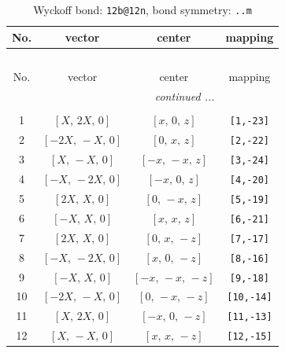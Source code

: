 \documentclass[fleqn,8pt]{jsarticle}
\begin{document}
\begin{longtable}{cccc}
\caption{Wyckoff bond: {\tt 12b@12n}, bond symmetry: {\tt ..m}}
 \\
 \hline \hline
No. & vector & center & mapping \\ \hline \endfirsthead

\multicolumn{3}{l}{\tablename\ \thetable{}} \\
 \hline \hline
No. & vector & center & mapping \\ \hline \endhead

 \hline \hline
\multicolumn{3}{r}{\footnotesize\it continued ...} \\ \endfoot

 \hline \hline
\multicolumn{3}{r}{} \\ \endlastfoot

1 & $\left[ X,\, 2 X,\, 0 \right]$ & $\left[ x,\, 0,\, z \right]$ & {\tt [1,-23]} \\ \hline
2 & $\left[ - 2 X,\, - X,\, 0 \right]$ & $\left[ 0,\, x,\, z \right]$ & {\tt [2,-22]} \\ \hline
3 & $\left[ X,\, - X,\, 0 \right]$ & $\left[ - x,\, - x,\, z \right]$ & {\tt [3,-24]} \\ \hline
4 & $\left[ - X,\, - 2 X,\, 0 \right]$ & $\left[ - x,\, 0,\, z \right]$ & {\tt [4,-20]} \\ \hline
5 & $\left[ 2 X,\, X,\, 0 \right]$ & $\left[ 0,\, - x,\, z \right]$ & {\tt [5,-19]} \\ \hline
6 & $\left[ - X,\, X,\, 0 \right]$ & $\left[ x,\, x,\, z \right]$ & {\tt [6,-21]} \\ \hline
7 & $\left[ 2 X,\, X,\, 0 \right]$ & $\left[ 0,\, x,\, - z \right]$ & {\tt [7,-17]} \\ \hline
8 & $\left[ - X,\, - 2 X,\, 0 \right]$ & $\left[ x,\, 0,\, - z \right]$ & {\tt [8,-16]} \\ \hline
9 & $\left[ - X,\, X,\, 0 \right]$ & $\left[ - x,\, - x,\, - z \right]$ & {\tt [9,-18]} \\ \hline
10 & $\left[ - 2 X,\, - X,\, 0 \right]$ & $\left[ 0,\, - x,\, - z \right]$ & {\tt [10,-14]} \\ \hline
11 & $\left[ X,\, 2 X,\, 0 \right]$ & $\left[ - x,\, 0,\, - z \right]$ & {\tt [11,-13]} \\ \hline
12 & $\left[ X,\, - X,\, 0 \right]$ & $\left[ x,\, x,\, - z \right]$ & {\tt [12,-15]} \\
\end{longtable}
\renewcommand{\arraystretch}{1.2}
\end{document}

